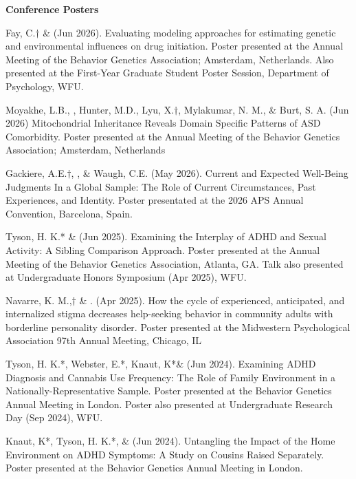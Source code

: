 {\large {\bf Conference Posters}}
\begin{etaremune}

\item Fay, C.$\dagger$ \& \meb (Jun 2026). Evaluating modeling approaches for estimating genetic and environmental influences on drug initiation. Poster presented at the Annual Meeting of the Behavior Genetics Association; Amsterdam, Netherlands.  Also presented at the First-Year Graduate Student Poster Session, Department of Psychology, WFU.

\item Moyakhe, L.B., \meb,  Hunter, M.D., Lyu, X.$\dagger$, Mylakumar, N. M., \& Burt, S. A. (Jun 2026) Mitochondrial Inheritance Reveals Domain Specific Patterns of ASD Comorbidity. Poster presented at the Annual Meeting of the Behavior Genetics Association; Amsterdam, Netherlands

\item Gackiere, A.E.$\dagger$, \meb, \& Waugh, C.E. (May 2026). Current and Expected Well-Being Judgments In a Global Sample: The Role of Current Circumstances, Past Experiences, and Identity. Poster presentated at the 2026 APS Annual Convention, Barcelona, Spain.

\item Tyson, H. K.* \& \meb (Jun 2025). Examining the Interplay of ADHD and Sexual Activity: A Sibling Comparison Approach. Poster presented at the Annual Meeting of the Behavior Genetics Association, Atlanta, GA. Talk also presented at Undergraduate Honors Symposium (Apr 2025), WFU.

\item Navarre, K. M.,$\dagger$ \& \meb. (Apr 2025). How the cycle of experienced, anticipated, and internalized stigma decreases help-seeking behavior in community adults with borderline personality disorder. Poster presented at the Midwestern Psychological Association 97th Annual Meeting, Chicago, IL

\item Tyson, H. K.*, Webster, E.*, Knaut, K*\& \meb (Jun 2024). Examining ADHD Diagnosis and Cannabis Use Frequency: The Role of Family Environment in a Nationally-Representative Sample. Poster presented at the Behavior Genetics Annual Meeting in London. Poster also presented at Undergraduate Research Day (Sep 2024), WFU.

\item Knaut, K*, Tyson, H. K.*, \& \meb (Jun 2024). Untangling the Impact of the Home Environment on ADHD Symptoms: A Study on Cousins Raised Separately. Poster presented at the Behavior Genetics Annual Meeting in London.


\end{etaremune}
